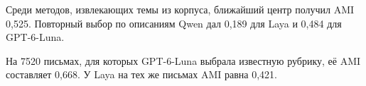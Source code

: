Среди методов, извлекающих темы из корпуса, ближайший центр получил AMI 0,525. Повторный выбор по описаниям Qwen дал 0,189 для Laya и 0,484 для GPT-6-Luna.

На 7520 письмах, для которых GPT-6-Luna выбрала известную рубрику, её AMI составляет 0,668. У Laya на тех же письмах AMI равна 0,421.
